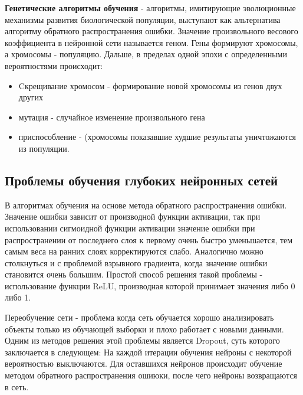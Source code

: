 \textbf{Генетические алгоритмы обучения} - алгоритмы, имитирующие эволюционные механизмы развития биологической популяции, выступают как альтернатива алгоритму обратного распространения ошибки. Значение произвольного весового коэффициента в нейронной сети называется геном. Гены формируют хромосомы, а хромосомы - популяцию. Дальше, в пределах одной эпохи с определенными вероятностями происходит: 
 \begin{itemize}
     \item Cкрещивание хромосом - формирование новой хромосомы из генов двух других
     \item мутация - случайное изменение произвольного гена
     \item приспособление - (хромосомы показавшие худшие результаты уничтожаются из популяции.
 \end{itemize}

% 

\subsection{Проблемы обучения глубоких нейронных сетей}

В алгоритмах обучения на основе метода обратного распространения ошибки. Значение ошибки зависит от производной функции активации, так при использовании сигмоидной функции активации значение ошибки при распространении от последнего слоя к первому очень быстро уменьшается, тем самым веса на ранних слоях корректируются слабо. Аналогично можно столкнуться и с проблемой взрывного градиента, когда значение ошибки становится очень большим. Простой способ решения такой проблемы - использование функции ReLU, производная которой принимает значения либо 0 либо 1.

Переобучение сети - проблема когда сеть обучается хорошо анализировать объекты только из обучающей выборки и плохо работает с новыми данными. Одним из методов решения этой проблемы является Dropout, суть которого заключается в следующем: На каждой итерации обучения нейроны с некоторой вероятностью выключаются. Для оставшихся нейронов происходит обучение методом обратного распространения ошиюки, после чего нейроны возвращаются в сеть. 




\clearpage